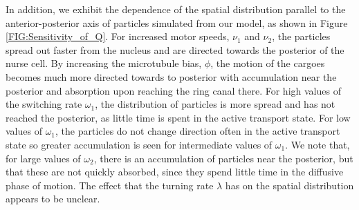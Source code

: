 \documentclass[twocolumn]{biophys}
\begin{document}
In addition, we exhibit the dependence of the spatial distribution parallel to the anterior-posterior axis of particles simulated from our model, as shown in Figure \ref{FIG:Sensitivity_of_Q}.
For increased motor speeds, $\nu_1$ and $\nu_2$, the particles spread out faster from the nucleus and are directed towards the posterior of the nurse cell.
By increasing the microtubule bias, $\phi$, the motion of the cargoes becomes much more directed towards to posterior with accumulation near the posterior and absorption upon reaching the ring canal there.
For high values of the switching rate $\omega_1$, the distribution of particles is more spread and has not reached the posterior, as little time is spent in the active transport state.
For low values of $\omega_1$, the particles do not change direction often in the active transport state so greater accumulation is seen for intermediate values of $\omega_1$.
We note that, for large values of $\omega_2$, there is an accumulation of particles near the posterior, but that these are not quickly absorbed, since they spend little time in the diffusive phase of motion.
The effect that the turning rate $\lambda$ has on the spatial distribution appears to be unclear.
\end{document}
